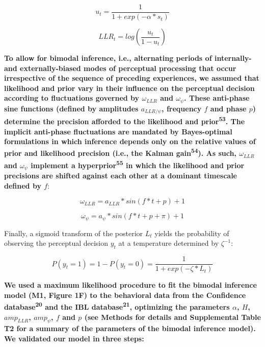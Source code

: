 \documentclass[
]{article}
\begin{document}
\begin{equation}
u_t = \frac{1}{1 + exp(-\alpha * s_t)}
\end{equation}

\begin{equation}
LLR_t = log(\frac{u_t}{1-u_t})
\end{equation}

\textbf{To allow for bimodal inference, i.e., alternating periods of
internally- and externally-biased modes of perceptual processing that
occur irrespective of the sequence of preceding experiences, we assumed
that likelihood and prior vary in their influence on the perceptual
decision according to fluctuations governed by \(\omega_{LLR}\) and
\(\omega_{\psi}\). These anti-phase sine functions (defined by
amplitudes \(a_{LLR/\psi}\), frequency \(f\) and phase \(p\)) determine
the precision afforded to the likelihood and prior\textsuperscript{53}.
The implicit anti-phase fluctuations are mandated by Bayes-optimal
formulations in which inference depends only on the relative values of
prior and likelihood precision (i.e., the Kalman
gain\textsuperscript{54}). As such, \(\omega_{LLR}\) and
\(\omega_{\psi}\) implement a hyperprior\textsuperscript{55} in which
the likelihood and prior precisions are shifted against each other at a
dominant timescale defined by \(f\)}:

\begin{equation}
\omega_{LLR} = a_{LLR} * sin(f * t + p) + 1
\end{equation}

\begin{equation}
\omega_{\psi} = a_{\psi} * sin(f * t + p + \pi) + 1
\end{equation}

Finally, a sigmoid transform of the posterior \(L_t\) yields the
probability of observing the perceptual decision \(y_t\) at a
temperature determined by \(\zeta^{-1}\):

\begin{equation}
P(y_t = 1) = 1 - P(y_t = 0) = \frac{1}{1 + exp(-\zeta * L_t)}
\end{equation}

\textbf{We used a maximum likelihood procedure to fit the bimodal
inference model (M1, Figure 1F) to the behavioral data from the
Confidence database\textsuperscript{20} and the IBL
database\textsuperscript{21}, optimizing the parameters \(\alpha\),
\(H\), \(amp_{LLR}\), \(amp_{\psi}\), \(f\) and \(p\) (see Methods for
details and Supplemental Table T2 for a summary of the parameters of the
bimodal inference model). We validated our model in three steps:}
\end{document}
